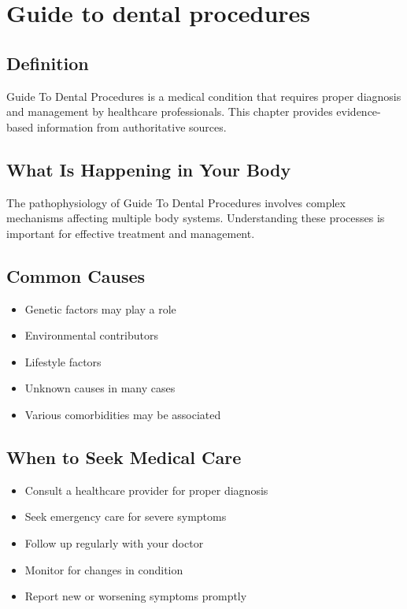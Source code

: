 
\chapter{Guide to dental procedures}

\section*{Definition}
Guide To Dental Procedures is a medical condition that requires proper diagnosis and management by healthcare professionals. This chapter provides evidence-based information from authoritative sources.

\section*{What Is Happening in Your Body}
The pathophysiology of Guide To Dental Procedures involves complex mechanisms affecting multiple body systems. Understanding these processes is important for effective treatment and management.

\section*{Common Causes}
\begin{itemize}
  \item Genetic factors may play a role
  \item Environmental contributors
  \item Lifestyle factors
  \item Unknown causes in many cases
  \item Various comorbidities may be associated
\end{itemize}

\section*{When to Seek Medical Care}
\begin{itemize}
  \item Consult a healthcare provider for proper diagnosis
  \item Seek emergency care for severe symptoms
  \item Follow up regularly with your doctor
  \item Monitor for changes in condition
  \item Report new or worsening symptoms promptly
\end{itemize}

